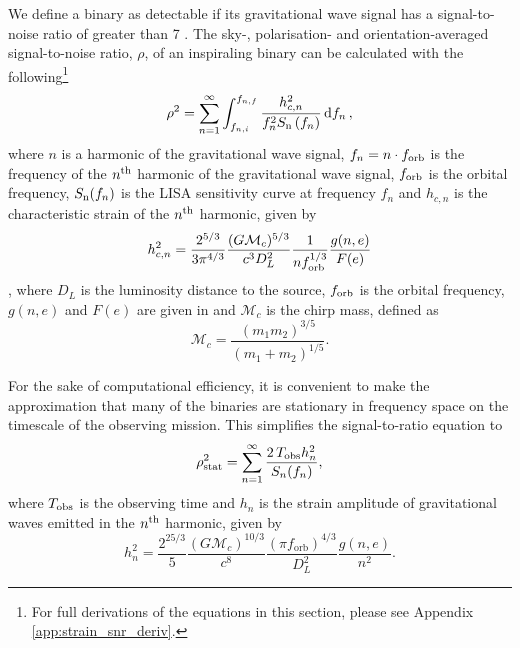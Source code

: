 \documentclass[twocolumn]{aastex63}
\begin{document}
We define a binary as detectable if its gravitational wave signal has a signal-to-noise ratio of greater than 7 \citep[e.g.][]{Breivik+2020, Korol+2020}. The sky-, polarisation- and orientation-averaged signal-to-noise ratio, $\rho$, of an inspiraling binary can be calculated with the following\footnote{For full derivations of the equations in this section, please see Appendix \ref{app:strain_snr_deriv}.} \citep[e.g.][]{Finn+2000}
\begin{equation}\label{eq:snr}
    \rho^2 = \sum_{n=1}^{\infty} \int_{f_{n, i}}^{f_{n, f}} \frac{h_{c, n}^{2}}{f_{n}^{2} S_{\rm n}\left(f_{n}\right)} \dd{f_n},
\end{equation}
where $n$ is a harmonic of the gravitational wave signal, $f_n = n \cdot f_{\rm orb}$ is the frequency of the $n^{\rm th}$ harmonic of the gravitational wave signal, $f_{\rm orb}$ is the orbital frequency, $S_{\rm n}(f_n)$ is the LISA sensitivity curve at frequency $f_n$ \citep[e.g.][]{Robson+2019} and $h_{c,n}$ is the characteristic strain of the $n^{\rm th}$ harmonic, given by
\begin{equation}\label{eq:charstrain}
    h^2_{c,n} = \frac{2^{5/3}}{3 \pi^{4/3}} \frac{(G \mathcal{M}_c)^{5/3}}{c^3 D_L^2} \frac{1}{n f_{\rm orb}^{1/3}} \frac{g(n,e)}{F(e)}
\end{equation}
\citep[e.g.][]{Barack+2004}, where $D_L$ is the luminosity distance to the source, $f_{\rm orb}$ is the orbital frequency, $g(n, e)$ and $F(e)$ are given in \citet{Peters+1963} and $\mathcal{M}_c$ is the chirp mass, defined as
\begin{equation}\label{eq:chirp_mass}
    \mathcal{M}_c = \frac{(m_1 m_2)^{3/5}}{(m_1 + m_2)^{1/5}}.
\end{equation}

For the sake of computational efficiency, it is convenient to make the approximation that many of the binaries are stationary in frequency space on the timescale of the observing mission. This simplifies the signal-to-ratio equation to
\begin{equation}\label{eq:snr_stat}
    \rho_{\rm stat}^2 = \sum_{n=1}^{\infty} \frac{2 \, T_{\rm obs} h_n^2}{S_n(f_n)},
\end{equation}
where $T_{\rm obs}$ is the observing time and $h_n$ is the strain amplitude of gravitational waves emitted in the $n^{\rm th}$ harmonic, given by
\begin{equation}
    h_n^2 = \frac{2^{25/3}}{5} \frac{\left(G \mathcal{M}_{c}\right)^{10/3}}{c^{8}} \frac{\left(\pi f_{\mathrm{orb}}\right)^{4 / 3}}{D_L^2} \frac{g(n, e)}{n^2}.
\end{equation}
\end{document}
